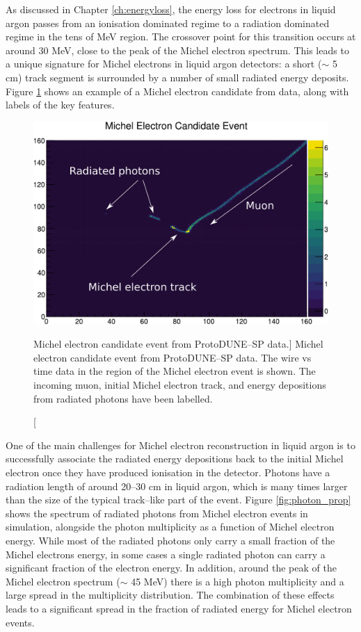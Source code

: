 As discussed in Chapter \ref{ch:energyloss}, the energy loss for electrons in
liquid argon passes from an ionisation dominated regime to a radiation dominated
regime in the tens of MeV region. The crossover point for this transition occurs
at around 30 MeV, close to the peak of the Michel electron spectrum. This
leads to a unique signature for Michel electrons in liquid argon detectors: a
short ($\sim$ 5 cm) track segment is surrounded by a number of small radiated
energy deposits. Figure \ref{fig:michel_event} shows an example of a Michel
electron candidate from \protodune{} data, along with labels of the key
features.

\begin{figure}
	\centering
	\includegraphics[width=\textwidth]{figures/michel_candidate_labelled.pdf}
	\caption
	[Michel electron candidate event from ProtoDUNE--SP data.]
	{Michel electron candidate event from ProtoDUNE--SP data. The wire vs time
	data in the region of the Michel electron event is shown. The incoming muon,
	initial Michel electron track, and energy depositions from radiated photons
	have been labelled.}
	\label{fig:michel_event}
\end{figure}

One of the main challenges for Michel electron reconstruction in liquid argon is
to successfully associate the radiated energy depositions back to the initial
Michel electron once they have produced ionisation in the detector. Photons have
a radiation length of around 20--30 cm in liquid argon, which is many times
larger than the size of the typical track--like part of the event. Figure
\ref{fig:photon_prop} shows the spectrum of radiated photons from Michel
electron events in \protodune{} simulation, alongside the photon multiplicity
as a function of Michel electron energy. While most of the radiated photons
only carry a small fraction of the Michel electrons energy, in some cases a
single radiated photon can carry a significant fraction of the electron
energy. In addition, around the peak of the Michel electron spectrum ($\sim$
45 MeV) there is a high photon multiplicity and a large spread in the
multiplicity distribution. The combination of these effects leads to a
significant spread in the fraction of radiated energy for Michel electron
events.

